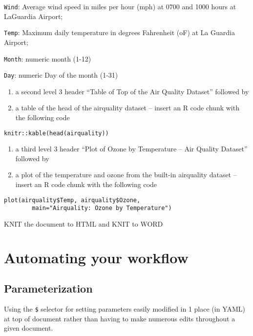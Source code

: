 \documentclass[
]{book}
\begin{document}
\texttt{Wind}: Average wind speed in miles per hour (mph) at 0700 and 1000 hours at LaGuardia Airport;

\texttt{Temp}: Maximum daily temperature in degrees Fahrenheit (oF) at La Guardia Airport;

\texttt{Month}: numeric month (1-12)

\texttt{Day}: numeric Day of the month (1-31)

\begin{enumerate}
\def\labelenumi{\arabic{enumi}.}
\setcounter{enumi}{4}
\item
  a second level 3 header ``Table of Top of the Air Quality Dataset'' followed by
\item
  a table of the head of the airquality dataset -- insert an R code chunk with the following code
\end{enumerate}

\begin{verbatim}
knitr::kable(head(airquality))
\end{verbatim}

\begin{enumerate}
\def\labelenumi{\arabic{enumi}.}
\setcounter{enumi}{6}
\item
  a third level 3 header ``Plot of Ozone by Temperature -- Air Quality Dataset'' followed by
\item
  a plot of the temperature and ozone from the built-in airquality dataset -- insert an R code chunk with the following code
\end{enumerate}

\begin{verbatim}
plot(airquality$Temp, airquality$Ozone, 
        main="Airquality: Ozone by Temperature")
\end{verbatim}

KNIT the document to HTML and KNIT to WORD

\hypertarget{automate}{%
\chapter{Automating your workflow}\label{automate}}

\hypertarget{parameterization}{%
\section{Parameterization}\label{parameterization}}

Using the \texttt{\$} selector for setting parameters easily modified in 1 place (in YAML) at top of document rather than having to make numerous edits throughout a given document.
\end{document}
